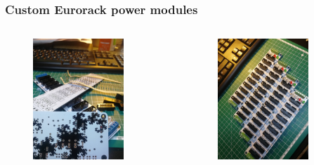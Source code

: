 \begin{frame}
\frametitle{Custom Eurorack power modules}
\begin{columns}
\begin{column}{0.5\textwidth}
	\begin{figure}[H]
		\centering
		\includegraphics[width=0.8\textwidth]{eurorack1.jpg}
	\end{figure}
\end{column}
\begin{column}{0.5\textwidth}
	\begin{figure}[H]
		\centering
		\includegraphics[width=0.8\textwidth]{eurorack2.jpg}

\end{figure}
\end{column}
\end{columns}
\end{frame}

